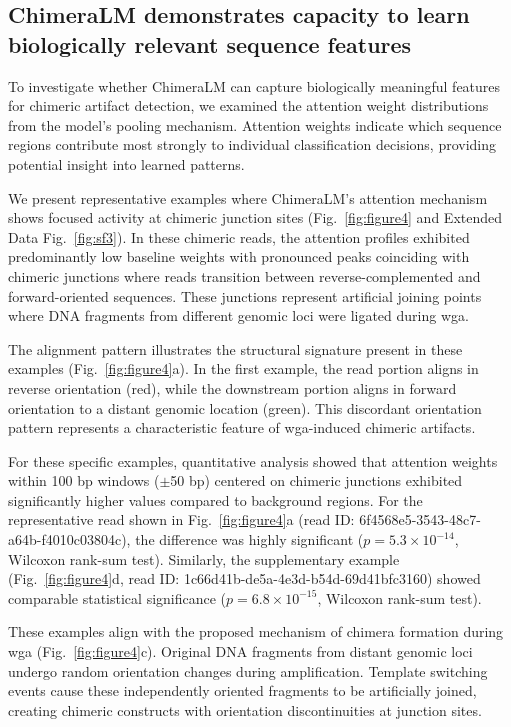 \documentclass[pdflatex,sn-nature]{sn-jnl}%
\theoremstyle{thmstyleone}%
\theoremstyle{thmstyletwo}%
\theoremstyle{thmstylethree}%
\begin{document}
\subsection*{ChimeraLM demonstrates capacity to learn biologically relevant sequence features}

To investigate whether ChimeraLM can capture biologically meaningful features for chimeric artifact detection, we examined the attention weight distributions from the model's pooling mechanism.
Attention weights indicate which sequence regions contribute most strongly to individual classification decisions, providing potential insight into learned patterns.

We present representative examples where ChimeraLM's attention mechanism shows focused activity at chimeric junction sites (Fig.~\ref{fig:figure4} and Extended Data Fig.~\ref{fig:sf3}).
In these chimeric reads, the attention profiles exhibited predominantly low baseline weights with pronounced peaks coinciding with chimeric junctions where reads transition between reverse-complemented and forward-oriented sequences.
These junctions represent artificial joining points where DNA fragments from different genomic loci were ligated during \gls{wga}.

The alignment pattern illustrates the structural signature present in these examples (Fig.~\ref{fig:figure4}a).
In the first example, the read portion aligns in reverse orientation (red), while the downstream portion aligns in forward orientation to a distant genomic location (green).
This discordant orientation pattern represents a characteristic feature of \gls{wga}-induced chimeric artifacts.

For these specific examples, quantitative analysis showed that attention weights within 100 bp windows ($\pm$50 bp) centered on chimeric junctions exhibited significantly higher values compared to background regions.
For the representative read shown in Fig.~\ref{fig:figure4}a (read ID: 6f4568e5-3543-48c7-a64b-f4010c03804c), the difference was highly significant ($p = 5.3 \times 10^{-14}$, Wilcoxon rank-sum test).
Similarly, the supplementary example (Fig.~\ref{fig:figure4}d, read ID: 1c66d41b-de5a-4e3d-b54d-69d41bfc3160) showed comparable statistical significance ($p = 6.8 \times 10^{-15}$, Wilcoxon rank-sum test).

These examples align with the proposed mechanism of chimera formation during \gls{wga} (Fig.~\ref{fig:figure4}c).
Original DNA fragments from distant genomic loci undergo random orientation changes during amplification.
Template switching events cause these independently oriented fragments to be artificially joined, creating chimeric constructs with orientation discontinuities at junction sites.
\end{document}
